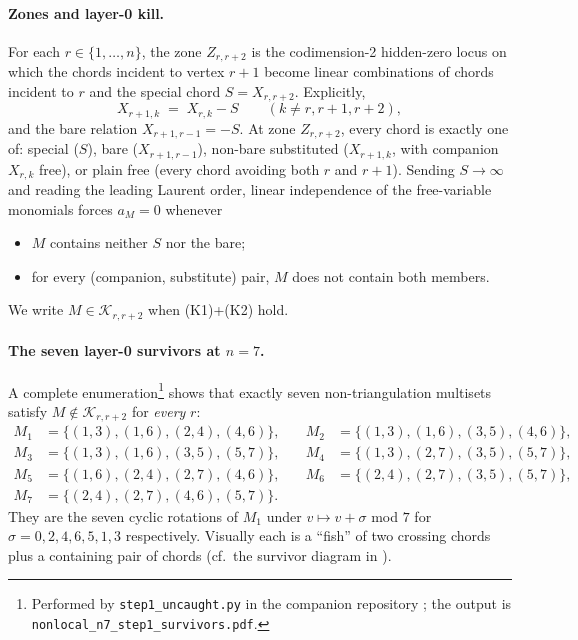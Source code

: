 \documentclass[11pt]{article}
\theoremstyle{definition}
\begin{document}
\paragraph{Zones and layer-0 kill.}
For each $r\in\{1,\dots,n\}$, the zone $Z_{r,r+2}$ is the codimension-2
hidden-zero locus on which the chords incident to vertex $r{+}1$ become
linear combinations of chords incident to $r$ and the special chord
$S=X_{r,r+2}$. Explicitly,
\[
   X_{r+1,k} \;=\; X_{r,k} - S \qquad (k\ne r,r{+}1,r{+}2),
\]
and the bare relation $X_{r+1,r-1} = -S$. At zone $Z_{r,r+2}$, every
chord is exactly one of: special ($S$), bare ($X_{r+1,r-1}$),
non-bare substituted ($X_{r+1,k}$, with companion $X_{r,k}$ free), or
plain free (every chord avoiding both $r$ and $r{+}1$). Sending
$S\to\infty$ and reading the leading Laurent order, linear independence
of the free-variable monomials forces $a_M=0$ whenever
\begin{itemize}[leftmargin=*,topsep=2pt,parsep=0pt,itemsep=2pt]
\item[(K1)] $M$ contains neither $S$ nor the bare;
\item[(K2)] for every (companion, substitute) pair, $M$ does not contain
       both members.
\end{itemize}
We write $M\in\mathcal{K}_{r,r+2}$ when (K1)+(K2) hold.

\paragraph{The seven layer-0 survivors at $n=7$.}
A complete enumeration\footnote{Performed by
\texttt{step1\_uncaught.py} in the companion repository \cite{repo}; the
output is \texttt{nonlocal\_n7\_step1\_survivors.pdf}.} shows that
exactly seven non-triangulation multisets satisfy
$M\notin\mathcal{K}_{r,r+2}$ for \emph{every} $r$:
\begin{equation}\label{eq:fish}
\begin{aligned}
M_1 &= \{(1,3),(1,6),(2,4),(4,6)\}, \quad &
M_2 &= \{(1,3),(1,6),(3,5),(4,6)\}, \\
M_3 &= \{(1,3),(1,6),(3,5),(5,7)\}, &
M_4 &= \{(1,3),(2,7),(3,5),(5,7)\}, \\
M_5 &= \{(1,6),(2,4),(2,7),(4,6)\}, &
M_6 &= \{(2,4),(2,7),(3,5),(5,7)\}, \\
M_7 &= \{(2,4),(2,7),(4,6),(5,7)\}. & &
\end{aligned}
\end{equation}
They are the seven cyclic rotations of $M_1$ under $v\mapsto v{+}\sigma$
mod $7$ for $\sigma=0,2,4,6,5,1,3$ respectively. Visually each is a
``fish'' of two crossing chords plus a containing pair of chords (cf.\
the survivor diagram in \cite{repo}).
\end{document}
